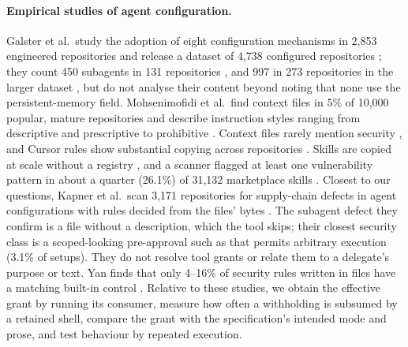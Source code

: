 \paragraph{Empirical studies of agent configuration.}
\label{sec:rw-config}
Galster et al.\ study the adoption of eight configuration mechanisms in 2,853 engineered repositories and release a
dataset of 4,738 configured repositories \citep{Galster2026Configuring,Galster2026Harness,Galster2026Dataset}; they
count 450 subagents in 131 repositories \citep[\S6.3]{Galster2026Harness}, and 997 in 273 repositories in the larger
dataset \citep{Galster2026Dataset}, but do not analyse their content beyond noting that none use the persistent-memory field. Mohsenimofidi et al.\ find context files in 5\%
of 10,000 popular, mature repositories and describe instruction styles ranging from descriptive and prescriptive to
prohibitive \citep{mohsenimofidi2026context}. Context files rarely mention security \citep{Chatlatanagulchai2026AgentREADMEs}, and Cursor rules show substantial
copying across repositories \citep{Jiang2026CursorRules}. Skills are copied at scale without a registry
\citep{Destefanis2026GitSkills}, and a scanner flagged at least one vulnerability pattern in about a quarter (26.1\%) of
31,132 marketplace skills \citep{Liu2026SkillsInTheWild}. Closest to our questions, Kapner et al.\ scan 3,171
repositories for supply-chain defects in agent configurations with rules decided from the files' bytes
\citep{Kapner2026ScanningHarness}. The subagent defect they confirm is a file without a description, which the tool skips;
their closest security class is a scoped-looking pre-approval such as  that permits arbitrary
execution (3.1\% of setups). They do not resolve tool grants or relate them to a delegate's purpose or text. Yan finds
that only 4--16\% of security rules written in  files have a matching built-in control
\citep{Yan2026DoNotDeny}. Relative to these studies, we obtain the effective grant by running its consumer, measure how
often a withholding is subsumed by a retained shell, compare the grant with the specification's intended mode and
prose, and test behaviour by repeated execution.

